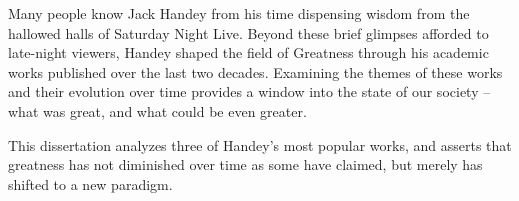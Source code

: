 Many people know Jack Handey from his time dispensing wisdom from the hallowed halls of Saturday Night Live.  Beyond these brief glimpses afforded to late-night viewers, Handey shaped the field of Greatness through his academic works published over the last two decades.  Examining the themes of these works and their evolution over time provides a window into the state of our society – what was great, and what could be even greater.
 
This dissertation analyzes three of Handey's most popular works, and asserts that greatness has not diminished over time as some have claimed, but merely has shifted to a new paradigm.   

